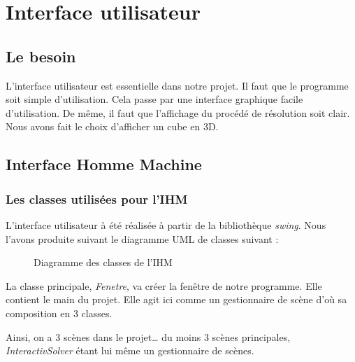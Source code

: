 \chapter{Interface utilisateur}
\section{Le besoin}
L'interface utilisateur est essentielle dans notre projet.
Il faut que le programme soit simple d'utilisation.
Cela passe par une interface graphique facile d'utilisation. De même, il faut que l'affichage du procédé de résolution soit clair.
Nous avons fait le choix d'afficher un cube en 3D.

\section{Interface Homme Machine}
\subsection{Les classes utilisées pour l'IHM}
L’interface utilisateur à été réalisée à partir de la bibliothèque \textit{swing}. Nous l’avons produite suivant le diagramme UML de classes suivant :

 \begin{figure}[h]
 \begin{center}
 \end{center}
     \caption{Diagramme des classes de l'IHM}
 \end{figure}


La classe principale, \textit{Fenetre}, va créer la fenêtre de notre programme. Elle contient le main du projet.
Elle agit ici comme un gestionnaire de scène d’où sa composition en 3 classes.

Ainsi, on a 3 scènes dans le projet… du moins 3 scènes principales, \textit{InteractivSolver} étant lui même un gestionnaire de scènes.

